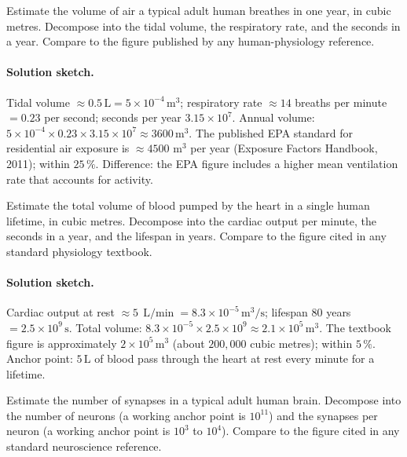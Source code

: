 \begin{exercise}
Estimate the volume of air a typical adult human breathes in one
year, in cubic metres. Decompose into the tidal volume, the
respiratory rate, and the seconds in a year. Compare to the figure
published by any human-physiology reference.
\end{exercise}

\paragraph{Solution sketch.}
Tidal volume $\approx 0.5 \,\si{\liter} = 5 \times 10^{-4}
\,\si{\meter\cubed}$; respiratory rate $\approx 14$ breaths per
minute $= 0.23$ per second; seconds per year $3.15 \times 10^{7}$.
Annual volume: $5 \times 10^{-4} \times 0.23 \times 3.15 \times
10^{7} \approx 3600 \,\si{\meter\cubed}$. The published EPA
standard for residential air exposure is $\approx 4500$
$\si{\meter\cubed}$ per year (Exposure Factors Handbook, 2011);
within $25\,\%$. Difference: the EPA figure includes a higher
mean ventilation rate that accounts for activity.

\begin{exercise}
Estimate the total volume of blood pumped by the heart in a single
human lifetime, in cubic metres. Decompose into the cardiac output
per minute, the seconds in a year, and the lifespan in years.
Compare to the figure cited in any standard physiology textbook.
\end{exercise}

\paragraph{Solution sketch.}
Cardiac output at rest $\approx 5 \,\si{\liter\per\min} = 8.3
\times 10^{-5} \,\si{\meter\cubed\per\second}$; lifespan $80$
years $= 2.5 \times 10^{9} \,\si{\second}$. Total volume:
$8.3 \times 10^{-5} \times 2.5 \times 10^{9} \approx 2.1 \times
10^{5} \,\si{\meter\cubed}$. The textbook figure is approximately
$2 \times 10^{5} \,\si{\meter\cubed}$ (about $200{,}000$ cubic
metres); within $5\,\%$. Anchor point: $5 \,\si{\liter}$ of blood
pass through the heart at rest every minute for a lifetime.

\begin{exercise}
Estimate the number of synapses in a typical adult human brain.
Decompose into the number of neurons (a working anchor point is
$10^{11}$) and the synapses per neuron (a working anchor point is
$10^{3}$ to $10^{4}$). Compare to the figure cited in any standard
neuroscience reference.
\end{exercise}

